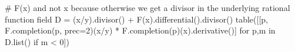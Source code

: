\begin{sageblock}[ch7-5]
# F(x) and not x because otherwise we get a divisor in the underlying rational function field
D = (x/y).divisor() + F(x).differential().divisor()
table([[p, F.completion(p, prec=2)(x/y) * F.completion(p)(x).derivative()] for p,m in D.list() if m < 0])
\end{sageblock}

\endexample

\begin{comment}

\example
Compute expansions at all multiple points of
the exercises in \cite{bliss} \S 68.

To facilitate this example, let's define an
auxiliary function to perform the analysis:

\begin{sageblocksmall}
def analyze_multiple_points(f, pr=False):
   P = f.parent()
   Base = P.base_ring()
   x,y = P.gens()
   # This next code is here to avoid Trac #25271, though it assumes
   # that the curve's polynomial has only rational coefficients.
   # (which is true for all of our test cases)
   if False:
      disc = f.discriminant(y)
   else:
      QQR = QQ[x,y]
      disc = P(QQR(f).discriminant(QQR(y)))
   if pr: print '$$', latex(disc.factor()), '$$'

   for x0 in Base[x](disc).roots(multiplicities=False):
      sheets = 0
      for y0 in Base[y](f.subs({x: x0})).roots(multiplicities=False):
          p = puiseux(f, x0, y0, 3)
          for cycle in p:
             assert(f.subs({x : cycle[0], y : cycle[1]}) == 0)
             if cycle[0] == x0:
                sheets = sheets + 1
             else:
                sheets = sheets + (cycle[0] - x0).valuation()
          if pr: print '$$', latex((x0,y0)), '$$'
          if pr: print '$$', latex(p), '$$'
      if f.subs({x: x0}).degree(y) != f.degree(y):
          p = puiseux(f, x0, oo, 3)
          for cycle in p:
             assert(f.subs({x : cycle[0], y : cycle[1]}) == 0)
             if cycle[0] == x0:
                sheets = sheets + 1
             else:
                sheets = sheets + (cycle[0] - x0).valuation()
          if pr: print '$$', latex((x0,oo)), '$$'
          if pr: print '$$', latex(p), '$$'
      assert(sheets == f.degree(y))

   finf = Base[y](f.subs({x: 1/x}).numerator().subs({x:0}))
   for y0 in finf.roots(multiplicities=False):
      p = puiseux(f, oo, y0, 3)
      for cycle in p:
         assert(f.subs({x : cycle[0], y : cycle[1]}) == 0)
      if pr: print '$$', latex((oo,y0)), '$$'
      if pr: print '$$', latex(p), '$$'
   if finf.degree() < f.degree(y):
      p = puiseux(f, oo, oo, 3)
      for cycle in p:
         assert(f.subs({x : cycle[0], y : cycle[1]}) == 0)
      if pr: print '$$', latex((oo,oo)), '$$'
      if pr: print '$$', latex(p), '$$'
\end{sageblocksmall}


\end{comment}
